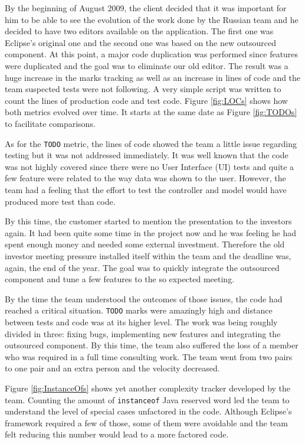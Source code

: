 \documentclass[lnbip]{svmultln}
\begin{document}
By the beginning of August 2009, the client decided that it was
important for him to be able to see the evolution of the work done by
the Russian team and he decided to have two editors available on the
application. The first one was Eclipse's original one and the second
one was based on the new outsourced component. At this point, a major
code duplication was performed since features were duplicated and the
goal was to eliminate our old editor. The result was a huge increase
in the marks tracking as well as an increase in lines of code and the
team suspected tests were not following. A very simple script was
written to count the lines of production code and test code. Figure
\ref{fig:LOCs} shows how both metrics evolved over time. It starts at
the same date as Figure \ref{fig:TODOs} to facilitate comparisons.

As for the \texttt{TODO} metric, the lines of code showed the team a
little issue regarding testing but it was not addressed
immediately. It was well known that the code was not highly covered
since there were no User Interface (UI) tests and quite a few feature
were related to the way data was shown to the user. However, the team
had a feeling that the effort to test the controller and model would
have produced more test than code.

By this time, the customer started to mention the presentation
to the investors again. It had been quite some time in the project now and
he was feeling he had spent enough money and needed some external
investment. Therefore the old investor meeting pressure installed
itself within the team and the deadline was, again, the end of the
year. The goal was to quickly integrate the outsourced component and
tune a few features to the so expected meeting.

By the time the team understood the outcomes of those issues,
the code had reached a critical situation. \texttt{TODO} marks were
amazingly high and distance between tests and code was at its higher
level. The work was being roughly divided in three: fixing bugs,
implementing new features and integrating the outsourced component. By
this time, the team also suffered the loss of a member who was
required in a full time consulting work. The team went from two pairs
to one pair and an extra person and the velocity decreased.

Figure \ref{fig:InstanceOfs} shows yet another complexity tracker
developed by the team. Counting the amount of \texttt{instanceof} Java
reserved word led the team to understand the level of special cases
unfactored in the code. Although Eclipse's framework required a few of
those, some of them were avoidable and the team felt reducing this
number would lead to a more factored code.
\end{document}
